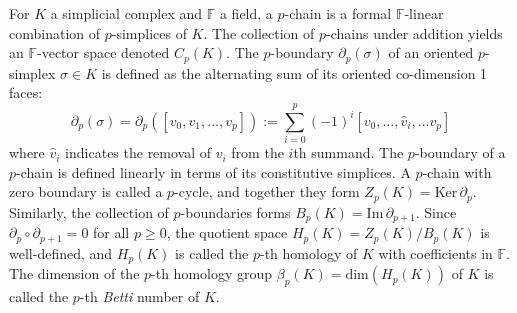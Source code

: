 \\
\\
For $K$ a simplicial complex and $\mathbb{F}$ a field, a $p$-chain is a formal $\mathbb{F}$-linear combination of $p$-simplices of $K$. The collection of $p$-chains under addition yields an $\mathbb{F}$-vector space denoted $C_p(K)$. 
The $p$-boundary $\partial_p(\sigma)$ of an oriented $p$-simplex $\sigma\in K$ is defined as the alternating sum of its oriented co-dimension 1 faces:
\begin{equation}\label{eq:alt_sum}
	\partial_p(\sigma) = \partial_p([v_0, v_1, \dots, v_p]) := \sum_{i=0}^p (-1)^i [v_0, \dots, \hat{v}_i, \dots v_p]
\end{equation}
where $\hat{v}_i$ indicates the removal of $v_i$ from the $i$th summand. The $p$-boundary of a $p$-chain is defined linearly in terms of its constitutive simplices. 
A $p$-chain with zero boundary is called a $p$-cycle, and together they form $Z_p(K) = \mathrm{Ker}\,\partial_p$. Similarly, the collection of $p$-boundaries forms  $B_p(K) = \mathrm{Im}\,\partial_{p+1}$. Since $\partial_p \circ \partial_{p+1} = 0$ for all $p\geq 0$, the quotient space $H_p(K) = Z_p(K) / B_{p}(K)$ is well-defined, and $H_p(K)$ is called the $p$-th homology of $K$ with coefficients in $\mathbb{F}$. The dimension of the $p$-th homology group $\beta_p(K) = \mathrm{dim}(H_p(K))$ of $K$ is called the $p$-th \emph{Betti} number of $K$. 

